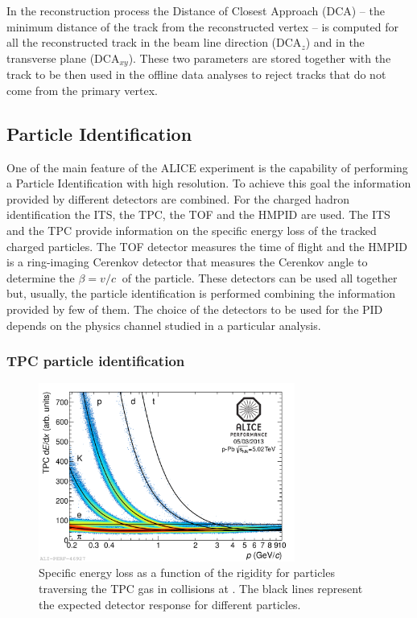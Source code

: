 In the reconstruction process the Distance of Closest Approach (DCA) -- the minimum 
distance of the track from the reconstructed vertex -- is computed for all the reconstructed
track in the beam line direction (DCA$_{z}$) and in the transverse plane (DCA$_{xy}$).
These two parameters are stored together with the track to be then used in the offline data analyses
to reject tracks that do not come from the primary vertex.

%
\subsection{Particle Identification} \label{sec:PID}

One of the main feature of the ALICE experiment is the capability of performing a Particle
Identification with high resolution.
To achieve this goal the information provided by different detectors are combined.
For the charged hadron identification the ITS, the TPC, the TOF and the HMPID are used.
The ITS and the TPC provide information on the specific energy loss of the tracked charged particles.
The TOF detector measures the time of flight and the HMPID is a ring-imaging Cerenkov detector that
measures the Cerenkov angle to determine the $\beta = v / c\ $ of the particle.
These detectors can be used all together but, usually, the particle identification is performed
combining the information provided by few of them.
The choice of the detectors to be used for the PID depends on the physics channel studied in a
particular analysis.

\subsubsection{TPC particle identification} \label{sec:TPC_PID}

\begin{figure} 
    \centering
    \includegraphics[width=0.75\textwidth]{gfx/pid_tpc_gen}
	\caption{Specific energy loss as a function of the rigidity for particles traversing the TPC gas in \pPb collisions at \sctev. The black lines represent the expected detector response for different particles.}
	\label{fig:pid_tpc}
\end{figure}

